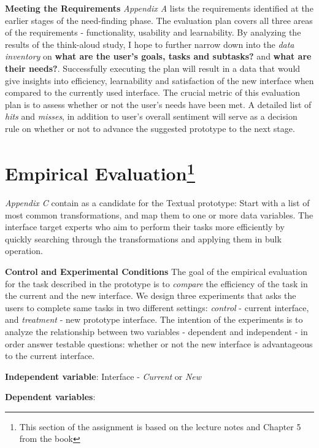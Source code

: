 \documentclass[12pt,letterpaper]{article}
\begin{document}
\textbf{Meeting the Requirements} \textit{Appendix A} lists the requirements identified at the earlier stages of the need-finding phase. The evaluation plan covers all three areas of the requirements - functionality, usability and learnability. By analyzing the results of the think-aloud study, I hope to further narrow down into the \textit{data inventory} on \textbf{what are the user's goals, tasks and subtasks?} and \textbf{what are their needs?}.  Successfully executing the plan will result in a data that would give insights into efficiency, learnability and satisfaction of the new interface when compared to the currently used interface. The crucial metric of this evaluation plan is to assess whether or not the user's needs have been met. A detailed list of \textit{hits} and \textit{misses}, in addition to user's overall sentiment will serve as a decision rule on whether or not to advance the suggested prototype to the next stage. 


\section*{Empirical Evaluation\footnote{This section of the assignment is based on the lecture notes and Chapter 5 from the \cite{mackenzie2012human} book}}
\textit{Appendix C}  contain as a candidate for the Textual prototype: Start with a list of most common transformations, and map them to one or more data variables. The interface target experts who aim to perform their tasks more efficiently by quickly searching through the transformations and applying them in bulk operation.

\textbf{Control and Experimental Conditions}
The goal of the empirical evaluation for the task described in the prototype is to \textit{compare} the efficiency of the task in the current and the new interface. We design three experiments that asks the users to complete same tasks in two different settings: \textit{control} - current interface, and \textit{treatment} - new prototype interface. The intention of the experiments is to analyze the relationship between two variables - dependent and independent - in order answer testable questions:  whether or not the new interface is advantageous to the current interface.

\hspace{10mm} \textbf{Independent variable}: Interface - \textit{Current} or \textit{New}  

\hspace{10mm} \textbf{Dependent variables}: 
\end{document}
